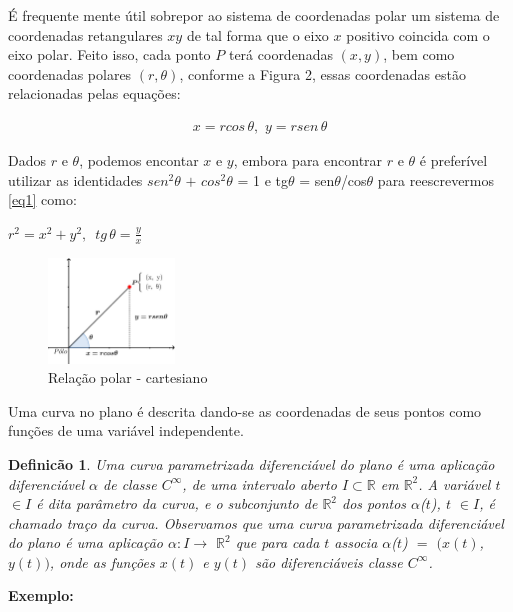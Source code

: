 \documentclass[twoside,a4paper,10pt]{article}
\newcommand{\R}{\mathbb R} %
\newtheorem{mydef}{Definicão}[section]
\begin{document}
É frequente mente útil sobrepor ao sistema de coordenadas polar um sistema de coordenadas retangulares $xy$ de tal forma que o eixo $x$ positivo coincida com o eixo polar. Feito isso, cada ponto $P$ terá coordenadas $(x,y)$, bem como coordenadas polares $(r, \theta)$, conforme a Figura 2, essas coordenadas estão relacionadas pelas equações:

\begin{eqnarray} \label{eq1}
	x = rcos\,\theta, \,\,y = r sen\,\theta
\end{eqnarray}

Dados $r$ e $\theta$, podemos encontar $x$ e $y$, embora para encontrar $r$ e $\theta$ é preferível utilizar as identidades $sen^2\theta$ $+$ $cos^2\theta$ = 1 e tg$\theta$ = sen$\theta$/cos$\theta$ para reescrevermos \eqref{eq1} como:

\begin{center}
	$r^2 = x^2 + y^2, \,\,\,tg\,\theta = \frac{y}{x}$
\end{center}

\begin{figure}[h!]
	\centering
	\includegraphics[width=0.3\textwidth]{p1}
	\caption{Relação polar - cartesiano}
\end{figure}

Uma curva no plano é descrita dando-se as coordenadas de seus pontos como funções de uma variável independente.\\

\begin{mydef}
	Uma \it{curva parametrizada diferenciável} do plano é uma aplicação diferenciável $\alpha$ de classe $C^{\infty}$, de uma intervalo aberto $I \subset \R$ em $\R^2$. A variável $t$ $\in I$ é dita parâmetro da curva, e o subconjunto de $\R^2$ dos pontos $\alpha$($t$), $t$ $\in I$, é chamado traço da curva.
	Observamos que uma curva parametrizada diferenciável do plano é uma aplicação $\alpha: I \rightarrow$ $\R^2$ que para cada $t$ associa $\alpha$($t$) $=$ $(x(t)$, $y(t))$, onde as funções $x(t)$ e $y(t)$ são diferenciáveis classe $C^{\infty}$.
\end{mydef}

\textbf{Exemplo:}\\
\end{document}
